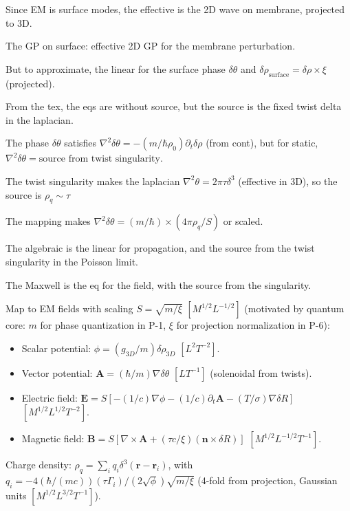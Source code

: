 Since EM is surface modes, the effective is the 2D wave on membrane, projected to 3D.

The GP on surface: effective 2D GP for the membrane perturbation.

But to approximate, the linear for the surface phase $\delta\theta$ and $\delta\rho_{\text{surface}} = \delta\rho \times \xi$ (projected).

From the tex, the eqs are without source, but the source is the fixed twist delta in the laplacian.

The phase $\delta\theta$ satisfies $\nabla^2 \delta\theta = - (m / \hbar \rho_0) \partial_t \delta\rho$ (from cont), but for static, $\nabla^2 \delta\theta = \text{source from twist singularity}$.

The twist singularity makes the laplacian $\nabla^2 \theta = 2\pi \tau \delta^3$ (effective in 3D), so the source is $\rho_q \sim \tau$

The mapping makes $\nabla^2 \delta\theta = (m / \hbar) \times (4\pi \rho_q / S)$ or scaled.

The algebraic is the linear for propagation, and the source from the twist singularity in the Poisson limit.

The Maxwell is the eq for the field, with the source from the singularity.

Map to EM fields with scaling $S = \sqrt{m / \xi}$ $[M^{1/2} L^{-1/2}]$ (motivated by quantum core: $m$ for phase quantization in P-1, $\xi$ for projection normalization in P-6):

\begin{itemize}
\item Scalar potential: $\phi = (g_{3D} / m) \delta \rho_{3D}$ $[L^2 T^{-2}]$.
\item Vector potential: $\mathbf{A} = (\hbar / m) \nabla \delta \theta$ $[L T^{-1}]$ (solenoidal from twists).
\item Electric field: $\mathbf{E} = S \left[ - (1/c) \nabla \phi - (1/c) \partial_t \mathbf{A} - (T/\sigma) \nabla \delta R \right]$ $[M^{1/2} L^{1/2} T^{-2}]$.
\item Magnetic field: $\mathbf{B} = S \left[ \nabla \times \mathbf{A} + (\tau c / \xi) (\mathbf{n} \times \delta R) \right]$ $[M^{1/2} L^{-1/2} T^{-1}]$.
\end{itemize}

Charge density: $\rho_q = \sum_i q_i \delta^3(\mathbf{r} - \mathbf{r}_i)$, with $q_i = -4 (\hbar / (m c)) (\tau \Gamma_i) / (2 \sqrt{\phi}) \sqrt{m / \xi}$ (4-fold from projection, Gaussian units $[M^{1/2} L^{3/2} T^{-1}]$).

